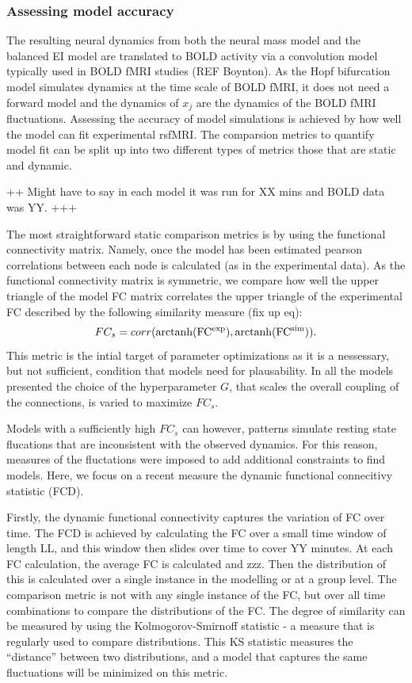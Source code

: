 \documentclass[oneside]{zHenriquesLab-StyleBioRxiv}
\begin{document}
\subsubsection*{Assessing model accuracy}
The resulting neural dynamics from both the neural mass model and the balanced EI model are translated to BOLD activity via a convolution model typically used in BOLD fMRI studies (REF Boynton). As the Hopf bifurcation model simulates dynamics at the time scale of BOLD fMRI, it does not need a forward model and the dynamics of $x_j$ are the dynamics of the BOLD fMRI fluctuations. Assessing the accuracy of model simulations is achieved by how well the model can fit experimental rsfMRI. The comparsion metrics to quantify model fit can be split up into two different types of metrics those that are static and dynamic. 

++ Might have to say in each model it was run for XX mins and BOLD data was YY. +++ 

The most straightforward static comparison metrics is by using the functional connectivity matrix. Namely, once the model has been estimated pearson correlations between each node is calculated (as in the experimental data). As the functional connectivity matrix is symmetric, we compare how well the upper triangle of the model FC matrix correlates the upper triangle of the experimental FC described by the following similarity measure (fix up eq):
\begin{equation}
	FC_{s} = corr({\rm arctanh(FC^{exp}}),{\rm arctanh(FC^{sim}})).
\end{equation}
This metric is the intial target of parameter optimizations as it is a nessessary, but not sufficient, condition that models need for plausability. In all the models presented the choice of the hyperparameter $G$, that scales the overall coupling of the connections, is varied to maximize $FC_s$.  

Models with a sufficiently high $FC_s$ can however, patterns simulate resting state flucations that are inconsistent with the observed dynamics. For this reason, measures of the fluctations were imposed to add additional constraints to find models. Here, we focus on a recent measure the dynamic functional connecitivy statistic (FCD).

Firstly, the dynamic functional connectivity captures the variation of FC over time. The FCD is achieved by calculating the FC over a small time window of length LL, and this window then slides over time to cover YY minutes. At each FC calculation, the average FC is calculated and zzz. Then the distribution of this is calculated over a single instance in the modelling or at a group level. The comparison metric is not with any single instance of the FC, but over all time combinations to compare the distributions of the FC. The degree of similarity can be measured by using the Kolmogorov-Smirnoff statistic - a measure that is regularly used to compare distributions. This KS statistic measures the ``distance'' between two distributions, and a model that captures the same fluctuations will be minimized on this metric. 
\end{document}
